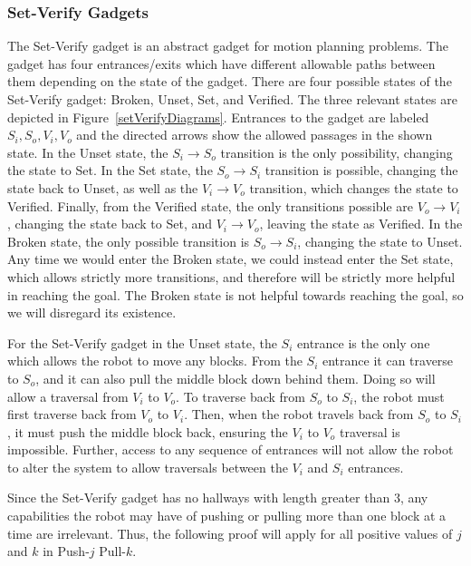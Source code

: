 \subsubsection{Set-Verify Gadgets}
\label{sec:SetVerifyGadgets}
The Set-Verify gadget is an abstract gadget for motion planning problems. The gadget has four entrances/exits which have different allowable paths between them depending on the state of the gadget. There are four possible states of the Set-Verify gadget: Broken, Unset, Set, and Verified. The three relevant states are depicted in Figure~\ref{setVerifyDiagrams}. Entrances to the gadget are labeled $S_i, S_o, V_i, V_o$ and the directed arrows show the allowed passages in the shown state. In the Unset state, the $S_i \rightarrow S_o$ transition is the only possibility, changing the state to Set. In the Set state, the $S_o \rightarrow S_i$ transition is possible, changing the state back to Unset, as well as the $V_i \rightarrow V_o$ transition, which changes the state to Verified. Finally, from the Verified state, the only transitions possible are $V_o \rightarrow V_i$, changing the state back to Set, and $V_i \rightarrow V_o$, leaving the state as Verified. In the Broken state, the only possible transition is $S_o \rightarrow S_i$, changing the state to Unset. Any time we would enter the Broken state, we could instead enter the Set state, which allows strictly more transitions, and therefore will be strictly more helpful in reaching the goal. The Broken state is not helpful towards reaching the goal, so we will disregard its existence.

For the Set-Verify gadget in the Unset state, the $S_i$ entrance is the only one which allows the robot to move any blocks. From the $S_i$ entrance it can traverse to $S_o$, and it can also pull the middle block down behind them. Doing so will allow a traversal from $V_i$ to $V_o$. To traverse back from $S_o$ to $S_i$, the robot must first traverse back from $V_o$ to $V_i$. Then, when the robot travels back from $S_o$ to $S_i$, it must push the middle block back, ensuring the $V_i$ to $V_o$ traversal is impossible. Further, access to any sequence of entrances will not allow the robot to alter the system to allow traversals between the $V_i$ and $S_i$ entrances. 

Since the Set-Verify gadget has no hallways with length greater than 3, any capabilities the robot may have of pushing or pulling more than one block at a time are irrelevant. Thus, the following proof will apply for all positive values of $j$ and $k$ in Push-$j$ Pull-$k$.

